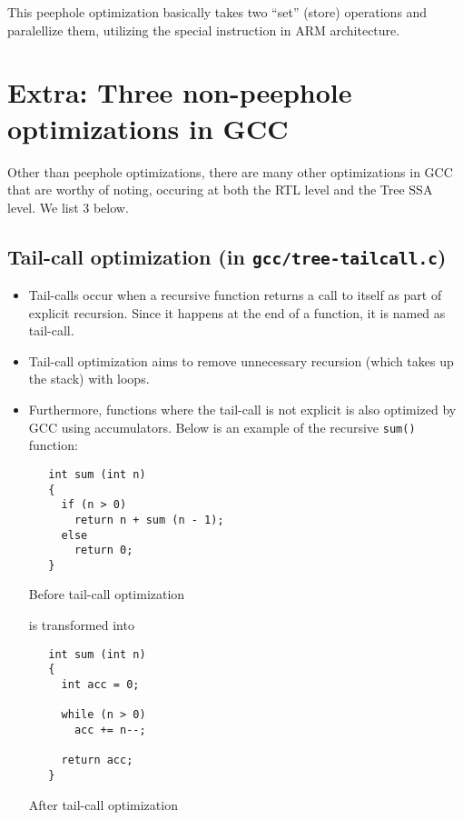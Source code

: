 \documentclass[11pt]{article}
\begin{document}
This peephole optimization basically takes two ``set'' (store) operations and
paralellize them, utilizing the special instruction in ARM architecture.

\section{Extra: Three non-peephole optimizations in GCC}
Other than peephole optimizations, there are many other optimizations in GCC
that are worthy of noting, occuring at both the RTL level and the Tree SSA
level. We list 3 below.
\label{sec:org3859f52}
\subsection{Tail-call optimization (in \texttt{gcc/tree-tailcall.c})}
\label{sec:orge8ff33e}
\begin{itemize}
\item Tail-calls occur when a recursive function returns a call to itself as part of
explicit recursion. Since it happens at the end of a function, it is named as
tail-call.
\item Tail-call optimization aims to remove unnecessary recursion (which takes up
the stack) with loops.
\item Furthermore, functions where the tail-call is not explicit is also optimized
by GCC using accumulators. Below is an example of the recursive \texttt{sum()}
function:

\begin{listing}[H]
\begin{verbatim}
   int sum (int n)
   {
     if (n > 0)
       return n + sum (n - 1);
     else
       return 0;
   }
\end{verbatim}
\caption{Before tail-call optimization}
\end{listing}

is transformed into

\begin{listing}[H]
\begin{verbatim}
   int sum (int n)
   {
     int acc = 0;

     while (n > 0)
       acc += n--;

     return acc;
   }
\end{verbatim}
\caption{After tail-call optimization}
\end{listing}
\end{itemize}
\end{document}

